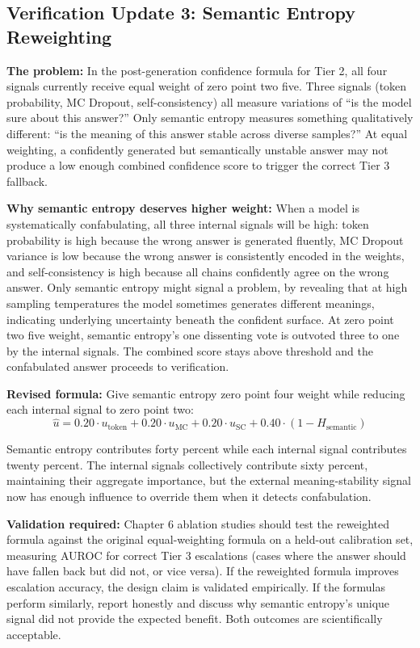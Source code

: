 \documentclass[11pt,a4paper]{article}
\newcommand{\architecturebox}[2]{%
\begin{tcolorbox}[enhanced,breakable,
  colback=LightTeal,colframe=Teal,boxrule=1.5pt,arc=4pt,
  left=8pt,right=8pt,top=6pt,bottom=6pt,
  title={\bfseries\small\color{white}#1},
  attach boxed title to top left={yshift=-2mm,xshift=6mm},
  boxed title style={colback=Teal,arc=3pt,boxrule=0pt,
    left=4pt,right=4pt,top=2pt,bottom=2pt}]
#2
\end{tcolorbox}}
\newcommand{\uhat}{\hat{u}}
\begin{document}
\subsection{Verification Update 3: Semantic Entropy Reweighting}

\architecturebox{VERIFICATION UPDATE 3: Higher Weight for Semantic Entropy in Post-Generation Confidence}{
\textbf{The problem:} In the post-generation confidence formula for Tier 2, all four signals currently receive equal weight of zero point two five. Three signals (token probability, MC Dropout, self-consistency) all measure variations of ``is the model sure about this answer?'' Only semantic entropy measures something qualitatively different: ``is the meaning of this answer stable across diverse samples?'' At equal weighting, a confidently generated but semantically unstable answer may not produce a low enough combined confidence score to trigger the correct Tier 3 fallback.

\textbf{Why semantic entropy deserves higher weight:} When a model is systematically confabulating, all three internal signals will be high: token probability is high because the wrong answer is generated fluently, MC Dropout variance is low because the wrong answer is consistently encoded in the weights, and self-consistency is high because all chains confidently agree on the wrong answer. Only semantic entropy might signal a problem, by revealing that at high sampling temperatures the model sometimes generates different meanings, indicating underlying uncertainty beneath the confident surface. At zero point two five weight, semantic entropy's one dissenting vote is outvoted three to one by the internal signals. The combined score stays above threshold and the confabulated answer proceeds to verification.

\textbf{Revised formula:} Give semantic entropy zero point four weight while reducing each internal signal to zero point two:
\[
\uhat = 0.20 \cdot u_{\text{token}} + 0.20 \cdot u_{\text{MC}} + 0.20 \cdot u_{\text{SC}} + 0.40 \cdot (1 - H_{\text{semantic}})
\]

Semantic entropy contributes forty percent while each internal signal contributes twenty percent. The internal signals collectively contribute sixty percent, maintaining their aggregate importance, but the external meaning-stability signal now has enough influence to override them when it detects confabulation.

\textbf{Validation required:} Chapter 6 ablation studies should test the reweighted formula against the original equal-weighting formula on a held-out calibration set, measuring AUROC for correct Tier 3 escalations (cases where the answer should have fallen back but did not, or vice versa). If the reweighted formula improves escalation accuracy, the design claim is validated empirically. If the formulas perform similarly, report honestly and discuss why semantic entropy's unique signal did not provide the expected benefit. Both outcomes are scientifically acceptable.

}
\end{document}
